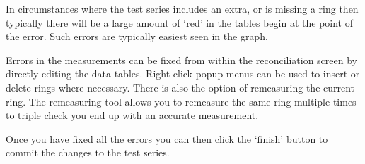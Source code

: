 In circumstances where the test series includes an extra, or is missing a ring then typically there will be a large amount of `red' in the tables begin at the point of the error.  Such errors are typically easiest seen in the graph.  

Errors in the measurements can be fixed from within the reconciliation screen by directly editing the data tables.  Right click popup menus can be used to insert or delete rings where necessary.  There is also the option of remeasuring the current ring.  The remeasuring tool allows you to remeasure the same ring multiple times to triple check you end up with an accurate measurement.

Once you have fixed all the errors you can then click the `finish' button to commit the changes to the test series.

